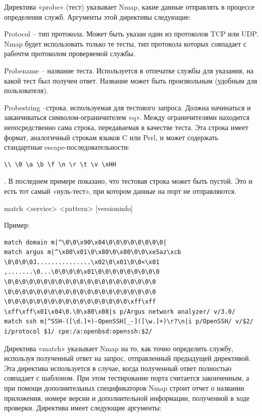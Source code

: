 \documentclass[12pt,a4paper]{report}
\begin{document}
Директива «probe» (тест) указывает Nmap, какие данные отправлять в процессе определения служб. Аргументы этой директивы следующие:

Protocol – тип протокола. Может быть указан один из протоколов TCP или UDP. Nmap будет использовать только те тесты, тип протокола которых совпадает с рабочтм протоколом проверяемой службы.

Probename – название теста. Используется в отпечатке службы для указания, на какой тест был получен ответ. Название может быть произвольным (удобным для пользователя).

Probestring –строка, используемая для тестового запроса. Должна начинаться и заканчиваться символом-ограничителем «q». Между ограничителями находится непосредственно сама строка, передаваемая в качестве теста. Эта строка имеет формат, аналогичный строкам языков C или Perl, и может содержать стандартные escape-последовательности: \begin{verbatim}\\ \0 \a \b \f \n \r \t \v \xHH 
\end{verbatim}. В последнем примере показано, что тестовая строка может быть пустой. Это и есть тот самый «нуль-тест», при котором данные на порт не отправляются.



match <service> <pattern> [versioninfo]

Пример:
\begin{lstlisting}[breaklines]
match domain m|^\0\0\x90\x04\0\0\0\0\0\0\0\0|
match argus m|^\x80\x01\0\x80\0\x80\0\0\xe5az\xcb
\0\0\0\0J...............\x02\0\x01\0\0<\x01
,.......\0...\0\0\0\0\x01\0\0\0\0\0\0\0\0\0
\0\0\0\0\0\0\0\0\0\0\0\0\0\0\0\0\0\0\0\0\0
\0\0\0\0\0\0\0\0\0\0\0\0\0\0\0\0\0\0\0\0\0
\0\0\0\0\0\0\0\0\0\0\0\0\0\0\0\0\0\xff\xff
\xff\xff\x01\x04\0.\0\x80\x08|s p/Argus network analyzer/ v/3.0/
match ssh m|^SSH-([\d.]+)-OpenSSH[_-]([\w.]+)\r?\n|i p/OpenSSH/ v/$2/ i/protocol $1/ cpe:/a:openbsd:openssh:$2/
\end{lstlisting}

Директива «match» указывает Nmap на то, как точно определить службу, используя полученный ответ на запрос, отправленный предыдущей директивой. Эта директива используется в случае, когда полученный ответ полностью совпадает с шаблоном. При этом тестирование порта считается законченным, а при помощи дополнительных спецификаторов Nmap строит отчет о названии приложения, номере версии и дополнительной информации, полученной в ходе проверки. Директива имеет следующие аргументы:
\end{document}
